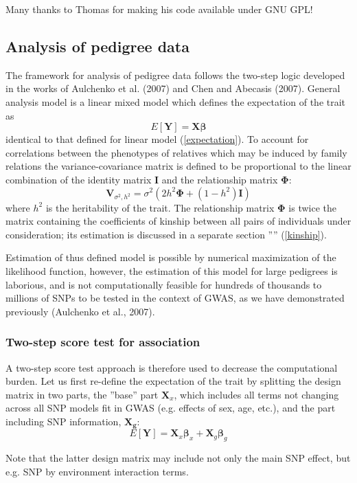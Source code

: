 \documentclass[12pt,a4paper]{article}
\begin{document}
Many thanks to Thomas for making his code available under GNU GPL!

\subsection{Analysis of pedigree data}

The framework for analysis of pedigree data follows the two-step 
logic developed in the works of Aulchenko et al. (2007) and Chen and Abecasis
(2007). General analysis model is a linear mixed model which defines the
expectation of the trait as 
$$
E[\mathbf{Y}] = \mathbf{X} \mathbf{\beta}
$$
identical to that defined for linear model (\ref{expectation}).
To account for correlations between the phenotypes of
relatives which may be induced by family relations the variance-covariance 
matrix is defined to be proportional to the linear combination of the
identity matrix $\mathbf{I}$ and the relationship matrix $\mathbf{\Phi}$: 
$$
\mathbf{V}_{\sigma^2,h^2} = \sigma^2 (2 h^2 \mathbf{\Phi} + (1-h^2) \mathbf{I})
$$
where $h^2$ is the heritability of the trait. 
The relationship matrix $\mathbf{\Phi}$ is twice the matrix containing 
the coefficients of kinship between all pairs of individuals under consideration; 
its estimation is discussed in a separate section '''' (\ref{kinship}).

Estimation of thus defined model is possible by numerical maximization of the
likelihood function, however, the estimation of this model 
for large pedigrees is laborious, and is not computationally feasible for
hundreds of thousands to millions of SNPs to be tested in the context of GWAS,
as we have demonstrated previously (Aulchenko et al., 2007).

\subsubsection{Two-step score test for association}

A two-step score test approach is therefore used to decrease the computational
burden. Let us first re-define the expectation of the trait by splitting the 
design matrix in two parts, the ''base'' part $\mathbf{X}_x$, which includes all 
terms not changing across all SNP models fit in GWAS (e.g. effects of sex, age, etc.), 
and the part including SNP information, $\mathbf{X_g}$:
$$
E[\mathbf{Y}] = \mathbf{X}_x \mathbf{\beta}_x + \mathbf{X}_g \mathbf{\beta}_g
$$

Note that the latter design matrix may include not only the main SNP effect, but 
e.g. SNP by environment interaction terms.
\end{document}
